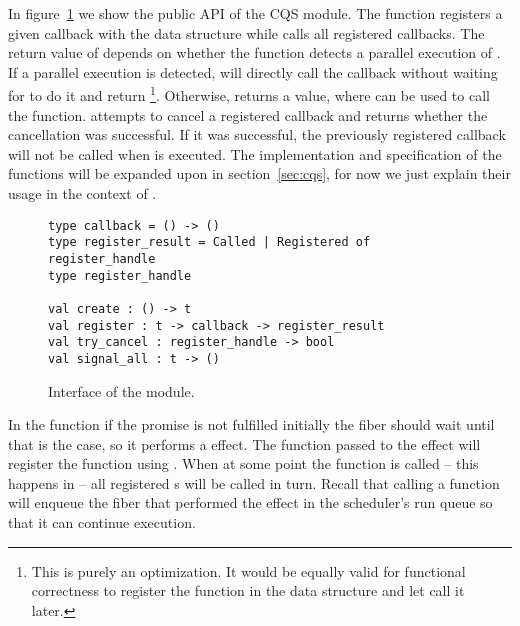 In figure~\ref{fig:sched-impl-cqs} we show the public API of the CQS module.
The  function registers a given callback with the data structure while  calls all registered callbacks.
The return value of  depends on whether the function detects a parallel execution of .
If a parallel execution is detected,  will directly call the callback without waiting for  to do it and return \footnote{This is purely an optimization. It would be equally valid for functional correctness to register the  function in the data structure and let  call it later.}.
Otherwise,  returns a  value, where  can be used to call the  function.
 attempts to cancel a registered callback and returns whether the cancellation was successful.
If it was successful, the previously registered callback will not be called when  is executed.
The implementation and specification of the functions will be expanded upon in section~\ref{sec:cqs}, for now we just explain their usage in the context of .

\begin{figure}[ht]
  \begin{verbatim}
type callback = () -> ()
type register_result = Called | Registered of register_handle
type register_handle

val create : () -> t
val register : t -> callback -> register_result
val try_cancel : register_handle -> bool
val signal_all : t -> ()
  \end{verbatim}
  \caption{Interface of the  module.}
  \label{fig:sched-impl-cqs}
\end{figure}

In the  function if the promise is not fulfilled initially the fiber should wait until that is the case, so it performs a \esuspend{} effect.
The  function passed to the effect will register the  function using .
When at some point the  function is called -- this happens in  -- all registered s will be called in turn.
Recall that calling a  function will enqueue the fiber that performed the \esuspend{} effect in the scheduler's run queue so that it can continue execution.

